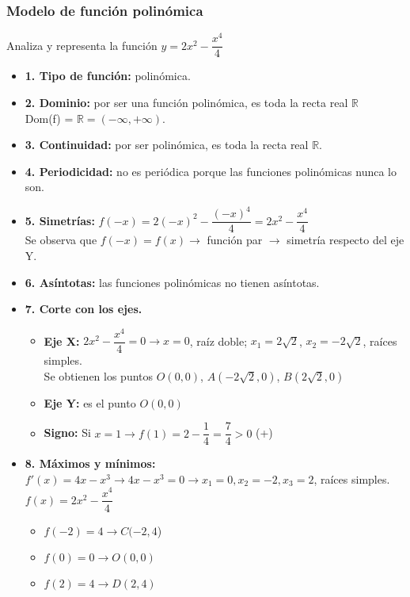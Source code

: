 \subsubsection{Modelo de función polinómica}
Analiza y representa la función $y = 2x^2 - \dfrac{x^4}{4}$
\begin{itemize}
	\item \textbf{1. Tipo de función: }polinómica.
	\item \textbf{2. Dominio: }por ser una función polinómica, es toda la recta real $\mathbb{R}$ \\
	Dom(f) = $\mathbb{R} = (-\infty, +\infty)$.
	\item \textbf{3. Continuidad: }por ser polinómica, es toda la recta real $\mathbb{R}$.
	\item \textbf{4. Periodicidad: }no es periódica porque las funciones polinómicas nunca lo son.
	\item \textbf{5. Simetrías: }$f(-x)=2(-x)^2-\dfrac{(-x)^4}{4}=2x^2-\dfrac{x^4}{4}$\\ Se observa que $f(-x)=f(x) \rightarrow$ función par $\rightarrow$ simetría respecto del eje Y.
	\item \textbf{6. Asíntotas: }las funciones polinómicas no tienen asíntotas.
	\item \textbf{7. Corte con los ejes.}
	\begin{itemize}
	\item \textbf{Eje X: }$2x^2-\dfrac{x^4}{4}=0 \rightarrow x=0$, raíz doble; $x_1=2\sqrt{2}$, $x_2=-2\sqrt{2}$, raíces simples.\\
	Se obtienen los puntos $O(0,0)$, $A(-2\sqrt{2},0)$, $B(2\sqrt{2},0)$
	\item \textbf{Eje Y: }es el punto $O(0,0)$
	\item \textbf{Signo: }Si $x=1 \rightarrow f(1)=2-\dfrac{1}{4}=\dfrac{7}{4}>0$ (+)
	\end{itemize}
	\item \textbf{8. Máximos y mínimos:}\\
		$f'(x)=4x-x^3 \rightarrow 4x-x^3=0 \rightarrow x_1 = 0, x_2 = -2, x_3=2$, raíces simples.\\
		$f(x)=2x^2-\dfrac{x^4}{4}$\\
		\begin{itemize}
			\item $f(-2)=4 \rightarrow C(-2,4$)\\
			\item $f(0)=0 \rightarrow O(0,0)$\\
			\item $f(2)=4 \rightarrow D(2,4)$\\

\end{itemize}
\end{itemize}
